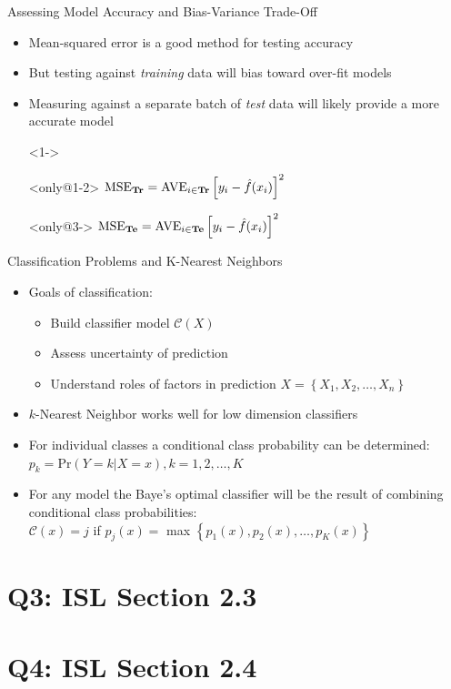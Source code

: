 \documentclass{beamer}
\begin{document}
\begin{frame}{Assessing Model Accuracy and Bias-Variance Trade-Off}
	\begin{itemize}
		\item<1-> Mean-squared error is a good method for testing accuracy
		\item<2-> But testing against \emph{training} data will bias toward over-fit models
		\item<3-> Measuring against a separate batch of \emph{test} data will likely provide a more accurate model 
		\item[]<1->
		\item[]<only@1-2> \hspace{3em}
			$\text{MSE}_{\text{\textbf{Tr}}}=\text{AVE}_{i\in\text{\textbf{Tr}}}\left[y_i-\hat{f}(x_i)\right]^2$
		\item[]<only@3-> \hspace{3em}
			$\text{MSE}_{\text{\textbf{Te}}}=\text{AVE}_{i\in\text{\textbf{Te}}}\left[y_i-\hat{f}(x_i)\right]^2$
	\end{itemize}
\end{frame}


\begin{frame}{Classification Problems and K-Nearest Neighbors}
	\begin{itemize}%
		\item Goals of classification:
		\begin{itemize}%
			\item Build classifier model $\mathcal{C}(X)$
			\item Assess uncertainty of prediction
			\item Understand roles of factors in prediction $X =\left\lbrace X_1, X_2, \ldots, X_n \right\rbrace $
		\end{itemize}
	\pause
		\item $k$-Nearest Neighbor works well for low dimension classifiers
		\item For individual classes a conditional class probability can be determined:
			\\ \vspace{0.5em} \hspace{4em}$p_k = \text{Pr}(Y=k|X=x), k=1,2,\ldots,K$
	\pause
		\item For any model the Baye's optimal classifier will be the result of combining conditional class probabilities:
			\\ \vspace{0.5em} \hspace{4em}$\mathcal{C}(x)=j $
			if $p_j(x) = $ max $\left\lbrace p_1(x), p_2(x),\ldots, p_K(x)\right\rbrace$
	\end{itemize}
\end{frame}

\section[Q3]{Q3: ISL Section 2.3}
\section[Q4]{Q4: ISL Section 2.4}
\end{document}
